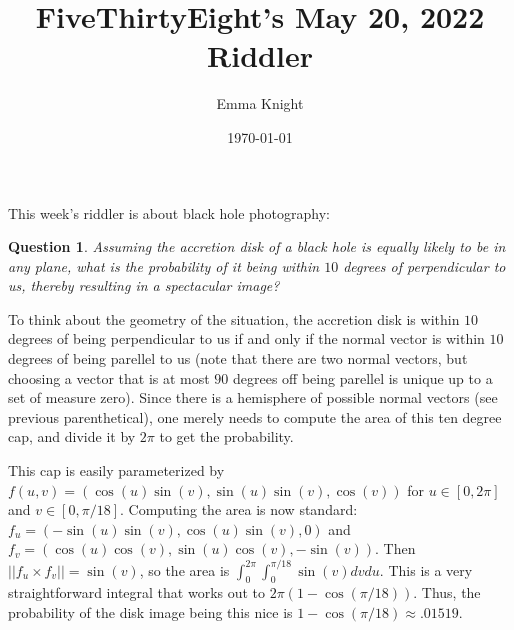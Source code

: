 \documentclass[11pt]{article}
\title{FiveThirtyEight's May 20, 2022 Riddler}
\author{Emma Knight}
\date{\today}
\newtheorem{question}[theorem]{Question}
\theoremstyle{definition}
\begin{document}
\maketitle
This week's riddler is about black hole photography:
\begin{question}
Assuming the accretion disk of a black hole is equally likely to be in any plane, what is the probability of it being within $10$ degrees of perpendicular to us, thereby resulting in a spectacular image?
\end{question}

To think about the geometry of the situation, the accretion disk is within $10$ degrees of being perpendicular to us if and only if the normal vector is within $10$ degrees of being parellel to us (note that there are two normal vectors, but choosing a vector that is at most $90$ degrees off being parellel is unique up to a set of measure zero).  Since there is a hemisphere of possible normal vectors (see previous parenthetical), one merely needs to compute the area of this ten degree cap, and divide it by $2\pi$ to get the probability.

This cap is easily parameterized by $f(u, v) = (\cos(u)\sin(v), \sin(u)\sin(v), \cos(v))$ for $u \in [0, 2\pi]$ and $v \in [0, \pi/18]$.  Computing the area is now standard: $f_u = (-\sin(u)\sin(v), \cos(u)\sin(v), 0)$ and $f_v = (\cos(u)\cos(v), \sin(u)\cos(v), -\sin(v))$.  Then $||f_u \times f_v|| = \sin(v)$, so the area is $\displaystyle{\int_0^{2\pi}\int_0^{\pi/18}\sin(v)dvdu}$.  This is a very straightforward integral that works out to $2\pi(1-\cos(\pi/18))$.  Thus, the probability of the disk image being this nice is $1-\cos(\pi/18) \approx .01519$.
\end{document}
